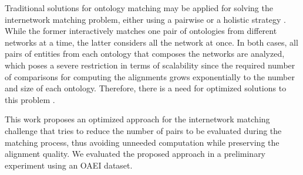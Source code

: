 \documentclass{llncs}
\begin{document}
Traditional solutions for ontology matching may be applied for solving the
internetwork matching problem, either using a pairwise or a holistic strategy  \cite{megdiche2016extensible}.  While the former interactively matches one pair of ontologies from different networks at a time, the latter considers all the network at once. In both cases, all pairs of entities from each ontology that composes the networks are analyzed, which poses a severe restriction in terms of scalability since the required number of comparisons for computing the alignments grows exponentially to the number and size of each ontology. Therefore, there is a need for optimized solutions to this problem \cite{shvaiko2013ontology}.

This work proposes an optimized approach for the internetwork matching challenge \cite{DBLP:conf/semweb/SantosRB17} that tries to reduce the number of pairs to be evaluated during the matching process, thus avoiding unneeded computation while preserving the alignment quality. We evaluated the proposed approach in a preliminary experiment using an OAEI dataset.




 



%
\end{document}
